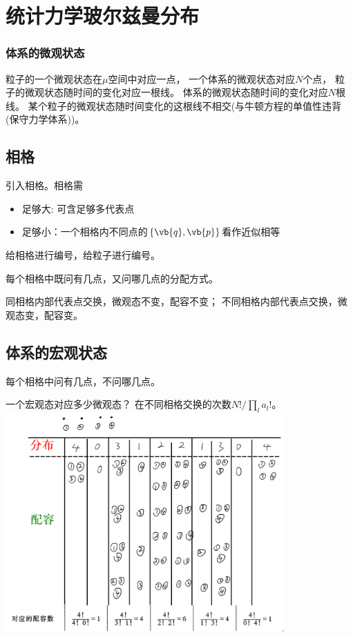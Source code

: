 
\section{统计力学玻尔兹曼分布}
\subsubsection{体系的微观状态}
粒子的一个微观状态在\(\mu \)空间中对应一点，
一个体系的微观状态对应\(N\)个点，
粒子的微观状态随时间的变化对应一根线。
体系的微观状态随时间的变化对应\(N\)根线。
某个粒子的微观状态随时间变化的这根线不相交(与牛顿方程的单值性违背(保守力学体系))。

\subsection{相格}
引入相格。相格需
\begin{itemize}
  \item 足够大: 可含足够多代表点
  \item 足够小：一个相格内不同点的\(\{\vb{q}, \vb{p}\}\)看作近似相等
\end{itemize}
给相格进行编号，给粒子进行编号。
\begin{definition}[配容]
每个相格中既问有几点，又问哪几点的分配方式。
\end{definition}
同相格内部代表点交换，微观态不变，配容不变；
不同相格内部代表点交换，微观态变，配容变。

\subsection{体系的宏观状态}
每个相格中问有几点，不问哪几点。

一个宏观态对应多少微观态？
在不同相格交换的次数\({N!} / {\prod_l a_l!}\)。
\\ \includegraphics[width=0.8\textwidth]{figures/2022-09-07T220102+0800.png} \\

